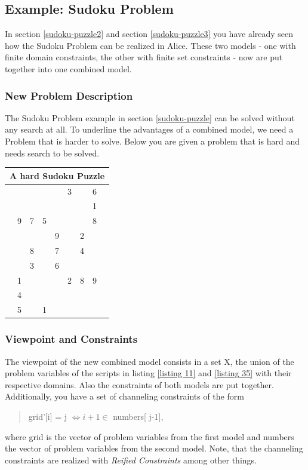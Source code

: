 \documentclass[a4paper,halfparskip]{scrartcl}
\begin{document}
\newpage
\subsection{Example: Sudoku Problem}
In section \ref{sudoku-puzzle2} and section \ref{sudoku-puzzle3}
you have already seen how the Sudoku Problem can be realized
in Alice. These two models - one with finite domain constraints,
the other with finite set constraints - now are put together
into one combined model.

\subsubsection{New Problem Description}
The Sudoku Problem example in section \ref{sudoku-puzzle} can
be solved without any search at all. To underline the advantages
of a combined model, we need a Problem that is harder to solve.
Below you are given a problem that is hard  and needs search to be 
solved.

\begin{tabular}{||c|c|c||c|c|c||c|c|c||}
\hline
\multicolumn{9}{||c||}{A hard Sudoku Puzzle \label{hard-sudoku-problem}}\\
\hline
\hline
 &  &  &  &  & 3  &  & 6 & \\
\hline
 &  &  &  &  &  &  & 1  & \\
\hline
 & 9 & 7 & 5 &  &  &  & 8 & \\
\hline
\hline
 &  &  &  & 9 &  & 2 &  & \\
\hline
 &  & 8 &  & 7 &  & 4 &  & \\
\hline
 &  & 3 &  & 6 &  &  &  & \\
\hline
\hline
 & 1 &  &  &  & 2 & 8 & 9 & \\
\hline
 & 4 &  &  &  &  &  &  & \\
\hline
 & 5 &  & 1 &  &  &  &  & \\
\hline   
\end{tabular}

\subsubsection{Viewpoint and Constraints}
The viewpoint of the new combined model consists in a set
X, the union of the problem variables of the scripts in listing
\ref{listing 11} and \ref{listing 35} with their respective
domains. Also the constraints of both models are put together.
Additionally, you have a set of channeling constraints of the
form
\begin{quote}
grid'[i] = j $\Leftrightarrow i+1 \in $ numbers[ j-1],
\end{quote}
where grid is the vector of problem variables from the first
model and numbers the vector of problem variables from the
second model. Note, that the channeling constraints are realized
with \emph{Reified Constraints} among other things.
\end{document}

